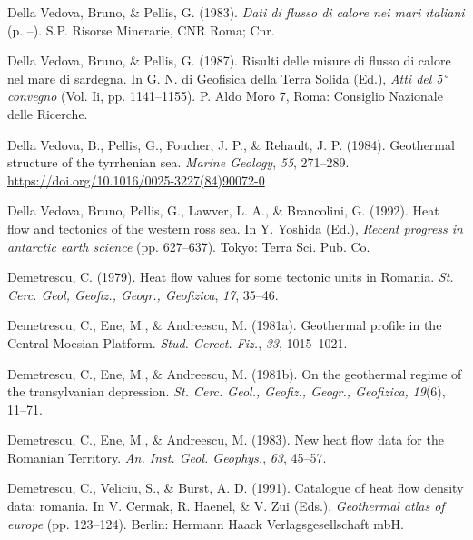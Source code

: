 \documentclass[draft,linenumbers]{agujournal2018}
\begin{document}
\leavevmode{}%
Della Vedova, Bruno, \& Pellis, G. (1983). \emph{Dati di flusso di
calore nei mari italiani} (p. --). S.P. Risorse Minerarie, CNR Roma;
Cnr.

\leavevmode{}%
Della Vedova, Bruno, \& Pellis, G. (1987). Risulti delle misure di
flusso di calore nel mare di sardegna. In G. N. di Geofisica della Terra
Solida (Ed.), \emph{Atti del 5° convegno} (Vol. Ii, pp. 1141--1155). P.
Aldo Moro 7, Roma: Consiglio Nazionale delle Ricerche.

\leavevmode{}%
Della Vedova, B., Pellis, G., Foucher, J. P., \& Rehault, J. P. (1984).
Geothermal structure of the tyrrhenian sea. \emph{Marine Geology},
\emph{55}, 271--289. \url{https://doi.org/10.1016/0025-3227(84)90072-0}

\leavevmode{}%
Della Vedova, Bruno, Pellis, G., Lawver, L. A., \& Brancolini, G.
(1992). Heat flow and tectonics of the western ross sea. In Y. Yoshida
(Ed.), \emph{Recent progress in antarctic earth science} (pp. 627--637).
Tokyo: Terra Sci. Pub. Co.

\leavevmode{}%
Demetrescu, C. (1979). Heat flow values for some tectonic units in
{Romania}. \emph{St. Cerc. Geol, Geofiz., Geogr., Geofizica}, \emph{17},
35--46.

\leavevmode{}%
Demetrescu, C., Ene, M., \& Andreescu, M. (1981a). Geothermal profile in
the {Central Moesian Platform}. \emph{Stud. Cercet. Fiz.}, \emph{33},
1015--1021.

\leavevmode{}%
Demetrescu, C., Ene, M., \& Andreescu, M. (1981b). On the geothermal
regime of the transylvanian depression. \emph{St. Cerc. Geol., Geofiz.,
Geogr., Geofizica,} \emph{19}(6), 11--71.

\leavevmode{}%
Demetrescu, C., Ene, M., \& Andreescu, M. (1983). New heat flow data for
the {Romanian Territory}. \emph{An. Inst. Geol. Geophys.}, \emph{63},
45--57.

\leavevmode{}%
Demetrescu, C., Veliciu, S., \& Burst, A. D. (1991). Catalogue of heat
flow density data: romania. In V. Cermak, R. Haenel, \& V. Zui (Eds.),
\emph{Geothermal atlas of europe} (pp. 123--124). Berlin: Hermann Haack
Verlagsgesellschaft mbH.
\end{document}
